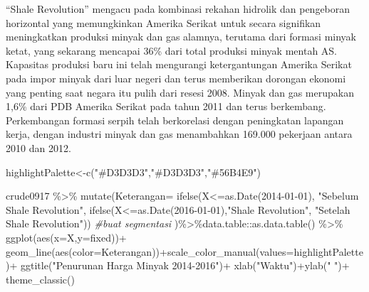 \documentclass[
]{book}
\newenvironment{Shaded}{\begin{snugshade}}{\end{snugshade}}
\newcommand{\AttributeTok}[1]{\textcolor[rgb]{0.77,0.63,0.00}{#1}}
\newcommand{\CommentTok}[1]{\textcolor[rgb]{0.56,0.35,0.01}{\textit{#1}}}
\newcommand{\FunctionTok}[1]{\textcolor[rgb]{0.00,0.00,0.00}{#1}}
\newcommand{\NormalTok}[1]{#1}
\newcommand{\OtherTok}[1]{\textcolor[rgb]{0.56,0.35,0.01}{#1}}
\newcommand{\SpecialCharTok}[1]{\textcolor[rgb]{0.00,0.00,0.00}{#1}}
\newcommand{\StringTok}[1]{\textcolor[rgb]{0.31,0.60,0.02}{#1}}
\begin{document}
``Shale Revolution'' mengacu pada kombinasi rekahan hidrolik dan pengeboran horizontal yang memungkinkan Amerika Serikat untuk secara signifikan meningkatkan produksi minyak dan gas alamnya, terutama dari formasi minyak ketat, yang sekarang mencapai 36\% dari total produksi minyak mentah AS. Kapasitas produksi baru ini telah mengurangi ketergantungan Amerika Serikat pada impor minyak dari luar negeri dan terus memberikan dorongan ekonomi yang penting saat negara itu pulih dari resesi 2008. Minyak dan gas merupakan 1,6\% dari PDB Amerika Serikat pada tahun 2011 dan terus berkembang. Perkembangan formasi serpih telah berkorelasi dengan peningkatan lapangan kerja, dengan industri minyak dan gas menambahkan 169.000 pekerjaan antara 2010 dan 2012.

\begin{Shaded}
\begin{Highlighting}[]
\NormalTok{highlightPalette}\OtherTok{\textless{}{-}}\FunctionTok{c}\NormalTok{(}\StringTok{"\#D3D3D3"}\NormalTok{,}\StringTok{"\#D3D3D3"}\NormalTok{,}\StringTok{"\#56B4E9"}\NormalTok{)}

\NormalTok{crude0917 }\SpecialCharTok{\%\textgreater{}\%}
  \FunctionTok{mutate}\NormalTok{(}\AttributeTok{Keterangan=}
           \FunctionTok{ifelse}\NormalTok{(X}\SpecialCharTok{\textless{}=}\FunctionTok{as.Date}\NormalTok{(}\StringTok{\textquotesingle{}2014{-}01{-}01\textquotesingle{}}\NormalTok{), }\StringTok{"Sebelum Shale Revolution"}\NormalTok{,}
           \FunctionTok{ifelse}\NormalTok{(X}\SpecialCharTok{\textless{}=}\FunctionTok{as.Date}\NormalTok{(}\StringTok{\textquotesingle{}2016{-}01{-}01\textquotesingle{}}\NormalTok{),}\StringTok{"Shale Revolution"}\NormalTok{,}
                                          \StringTok{"Setelah Shale Revolution"}\NormalTok{))}
         \CommentTok{\#buat segmentasi }
\NormalTok{  )}\SpecialCharTok{\%\textgreater{}\%}\NormalTok{data.table}\SpecialCharTok{::}\FunctionTok{as.data.table}\NormalTok{() }\SpecialCharTok{\%\textgreater{}\%}
  \FunctionTok{ggplot}\NormalTok{(}\FunctionTok{aes}\NormalTok{(}\AttributeTok{x=}\NormalTok{X,}\AttributeTok{y=}\NormalTok{fixed))}\SpecialCharTok{+}
  \FunctionTok{geom\_line}\NormalTok{(}\FunctionTok{aes}\NormalTok{(}\AttributeTok{color=}\NormalTok{Keterangan))}\SpecialCharTok{+}\FunctionTok{scale\_color\_manual}\NormalTok{(}\AttributeTok{values=}\NormalTok{highlightPalette)}\SpecialCharTok{+}
  \FunctionTok{ggtitle}\NormalTok{(}\StringTok{"Penurunan Harga Minyak 2014{-}2016"}\NormalTok{)}\SpecialCharTok{+}
  \FunctionTok{xlab}\NormalTok{(}\StringTok{"Waktu"}\NormalTok{)}\SpecialCharTok{+}\FunctionTok{ylab}\NormalTok{(}\StringTok{" "}\NormalTok{)}\SpecialCharTok{+}
  \FunctionTok{theme\_classic}\NormalTok{()}
\end{Highlighting}
\end{Shaded}
\end{document}
